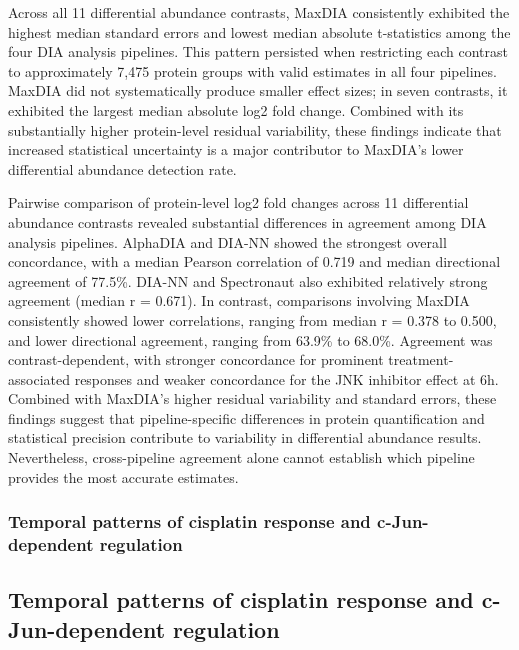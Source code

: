 \documentclass[
  10pt,
]{article}
\begin{document}
Across all 11 differential abundance contrasts, MaxDIA consistently
exhibited the highest median standard errors and lowest median absolute
t-statistics among the four DIA analysis pipelines. This pattern
persisted when restricting each contrast to approximately 7,475 protein
groups with valid estimates in all four pipelines. MaxDIA did not
systematically produce smaller effect sizes; in seven contrasts, it
exhibited the largest median absolute log2 fold change. Combined with
its substantially higher protein-level residual variability, these
findings indicate that increased statistical uncertainty is a major
contributor to MaxDIA's lower differential abundance detection rate.

Pairwise comparison of protein-level log2 fold changes across 11
differential abundance contrasts revealed substantial differences in
agreement among DIA analysis pipelines. AlphaDIA and DIA-NN showed the
strongest overall concordance, with a median Pearson correlation of
0.719 and median directional agreement of 77.5\%. DIA-NN and Spectronaut
also exhibited relatively strong agreement (median r = 0.671). In
contrast, comparisons involving MaxDIA consistently showed lower
correlations, ranging from median r = 0.378 to 0.500, and lower
directional agreement, ranging from 63.9\% to 68.0\%. Agreement was
contrast-dependent, with stronger concordance for prominent
treatment-associated responses and weaker concordance for the JNK
inhibitor effect at 6h. Combined with MaxDIA's higher residual
variability and standard errors, these findings suggest that
pipeline-specific differences in protein quantification and statistical
precision contribute to variability in differential abundance results.
Nevertheless, cross-pipeline agreement alone cannot establish which
pipeline provides the most accurate estimates.

\subsubsection{Temporal patterns of cisplatin response and
c-Jun-dependent
regulation}\label{temporal-patterns-of-cisplatin-response-and-c-jun-dependent-regulation}

\subsection{Temporal patterns of cisplatin response and c-Jun-dependent
regulation}\label{temporal-patterns-of-cisplatin-response-and-c-jun-dependent-regulation-1}
\end{document}
